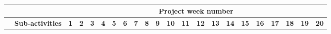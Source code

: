 \begin{table}[ht]
    \begin{tabular}{ll|llllllllllllllllllll|}
    \cline{3-22}
                                                                           &                                                                                                                      & \multicolumn{20}{c|}{\cellcolor[HTML]{38FFF8}\textbf{Project week number}}                                                                                                                                                                                                                                                                                                                                                                                                                                                                                                                                                                                                                                                                                                                                                                                                                                                                                                                                                                                                                                                                                          \\ \hline
    \rowcolor[HTML]{38FFF8} 
    \multicolumn{1}{|l|}{\cellcolor[HTML]{38FFF8}\textbf{Activities}}      & \textbf{Sub-activities}                                                                                              & \multicolumn{1}{l|}{\cellcolor[HTML]{38FFF8}\textbf{1}} & \multicolumn{1}{l|}{\cellcolor[HTML]{38FFF8}\textbf{2}} & \multicolumn{1}{l|}{\cellcolor[HTML]{38FFF8}\textbf{3}} & \multicolumn{1}{l|}{\cellcolor[HTML]{38FFF8}\textbf{4}} & \multicolumn{1}{l|}{\cellcolor[HTML]{38FFF8}\textbf{5}} & \multicolumn{1}{l|}{\cellcolor[HTML]{38FFF8}\textbf{6}} & \multicolumn{1}{l|}{\cellcolor[HTML]{38FFF8}\textbf{7}} & \multicolumn{1}{l|}{\cellcolor[HTML]{38FFF8}\textbf{8}} & \multicolumn{1}{l|}{\cellcolor[HTML]{38FFF8}\textbf{9}} & \multicolumn{1}{l|}{\cellcolor[HTML]{38FFF8}\textbf{10}} & \multicolumn{1}{l|}{\cellcolor[HTML]{38FFF8}\textbf{11}} & \multicolumn{1}{l|}{\cellcolor[HTML]{38FFF8}\textbf{12}} & \multicolumn{1}{l|}{\cellcolor[HTML]{38FFF8}\textbf{13}} & \multicolumn{1}{l|}{\cellcolor[HTML]{38FFF8}\textbf{14}} & \multicolumn{1}{l|}{\cellcolor[HTML]{38FFF8}\textbf{15}} & \multicolumn{1}{l|}{\cellcolor[HTML]{38FFF8}\textbf{16}} & \multicolumn{1}{l|}{\cellcolor[HTML]{38FFF8}\textbf{17}} & \multicolumn{1}{l|}{\cellcolor[HTML]{38FFF8}\textbf{18}} & \multicolumn{1}{l|}{\cellcolor[HTML]{38FFF8}\textbf{19}} & \textbf{20} \\ \hline

\end{tabular}
\end{table}
